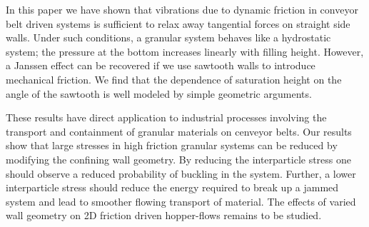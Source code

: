 
%
%
%


In this paper we have shown that vibrations due to dynamic friction in conveyor belt driven systems is sufficient to relax away tangential forces on straight side walls. Under such conditions, a granular system behaves like a hydrostatic system; the pressure at the bottom increases linearly with filling height.  However, a Janssen effect can be recovered if we use sawtooth walls to introduce mechanical friction.  We find that the dependence of saturation height on the angle of the sawtooth is well modeled by simple geometric arguments.

These results have direct application to industrial processes involving the transport and containment of granular materials on cenveyor belts. Our results show that large stresses in high friction granular systems can be reduced by modifying the confining wall geometry. By reducing the interparticle stress one should observe a reduced probability of buckling in the system.  Further, a lower interparticle stress should reduce the energy required to break up a jammed system and lead to smoother flowing transport of material.  The effects of varied wall geometry on 2D friction driven hopper-flows remains to be studied.